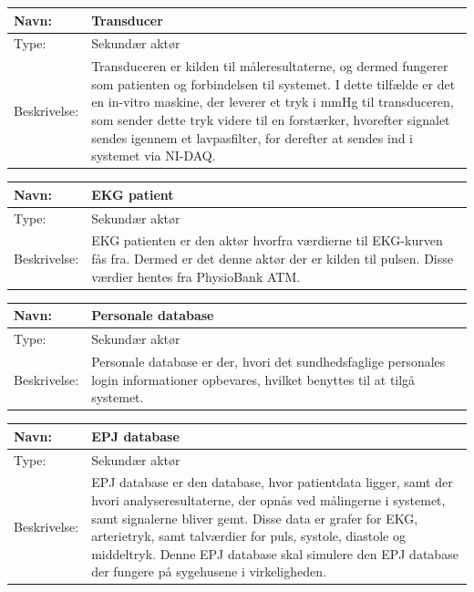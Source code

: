 \begin{table}[h!]
\begin{tabular}{| >{\raggedright\arraybackslash}p{3cm} | >{\raggedright\arraybackslash}p{12cm} |}
   \hline
   Navn: & Transducer\\ \hline
   Type: & Sekundær aktør \\ \hline
   Beskrivelse: & Transduceren er kilden til måleresultaterne, og dermed fungerer som patienten og forbindelsen til systemet. I dette tilfælde er det en in-vitro maskine, der leverer et tryk i mmHg til transduceren, som sender dette tryk videre til en forstærker, hvorefter signalet sendes igennem et lavpasfilter, for derefter at sendes ind i systemet via NI-DAQ.\\ \hline
\end{tabular}
\end{table}

\begin{table}[h!]
\begin{tabular}{| >{\raggedright\arraybackslash}p{3cm} | >{\raggedright\arraybackslash}p{12cm} |}
   \hline
   Navn: & EKG patient\\ \hline
   Type: & Sekundær aktør \\ \hline
   Beskrivelse: & EKG patienten er den aktør hvorfra værdierne til EKG-kurven fås fra. Dermed er det denne aktør der er kilden til pulsen. Disse værdier hentes fra PhysioBank ATM.\\ \hline
\end{tabular}
\end{table}


\begin{table}[h!]
\begin{tabular}{| >{\raggedright\arraybackslash}p{3cm} | >{\raggedright\arraybackslash}p{12cm} |}
   \hline
   Navn: & Personale database\\ \hline
   Type: & Sekundær aktør \\ \hline
   Beskrivelse: & Personale database er der, hvori det sundhedsfaglige personales login informationer opbevares, hvilket benyttes til at tilgå systemet. \\ \hline
\end{tabular}
\end{table}


\begin{table}[h!]
\begin{tabular}{| >{\raggedright\arraybackslash}p{3cm} | >{\raggedright\arraybackslash}p{12cm} |}
   \hline
   Navn: & EPJ database\\ \hline
   Type: & Sekundær aktør \\ \hline
   Beskrivelse: & EPJ database er den database, hvor patientdata ligger, samt der hvori analyseresultaterne, der opnås ved målingerne i systemet, samt signalerne bliver gemt. Disse data er grafer for EKG, arterietryk, samt talværdier for puls, systole, diastole og middeltryk. Denne EPJ database skal simulere den EPJ database der fungere på sygehusene i virkeligheden.\\ \hline
\end{tabular}
\end{table}


